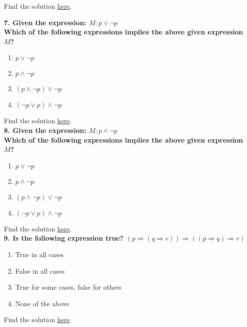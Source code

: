 Find the solution \hyperref[sec:raceXcertora_q6]{here}.\\

\pagebreak

\textbf{7. Given the expression: $M:p\vee\neg p$\\
Which of the following expressions implies the above given expression $M$?}

\begin{enumerate}[label=\Alph*.]
    \item $p\vee\neg p$
    \item $p\wedge\neg p$
    \item $(p\wedge\neg p)\vee\neg p$
    \item $(\neg p\vee p)\wedge\neg p$
\end{enumerate}

Find the solution \hyperref[sec:raceXcertora_q7]{here}.\\

\textbf{8. Given the expression: $M:p\wedge\neg p$\\
Which of the following expressions implies the above given expression $M$?}

\begin{enumerate}[label=\Alph*.]
    \item $p\vee\neg p$
    \item $p\wedge\neg p$
    \item $(p\wedge\neg p)\vee\neg p$
    \item $(\neg p\vee p)\wedge\neg p$
\end{enumerate}

Find the solution \hyperref[sec:raceXcertora_q8]{here}.\\

\textbf{9. Is the following expression true? $(p\Rightarrow (q\Rightarrow r))\Rightarrow((p\Rightarrow q)\Rightarrow r)$}

\begin{enumerate}[label=\Alph*.]
    \item True in all cases
    \item False in all cases
    \item True for some cases, false for others
    \item None of the above
\end{enumerate}

Find the solution \hyperref[sec:raceXcertora_q9]{here}.\\

\pagebreak

